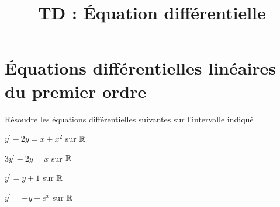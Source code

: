 \documentclass[a4paper, 11pt,reqno]{article}
\newcommand{\type}{TD }
\begin{document}
\title{\type  : Équation différentielle} 



\noindent \section{{\bf\Large{\'Equations diff\'erentielles lin\'eaires du premier ordre}}}
\vspace{0.2cm}

\begin{exercice}  \;
R\'esoudre les \'equations diff\'erentielles suivantes sur l'intervalle indiqu\'e
\begin{enumerate}
\begin{minipage}[c]{0.45\linewidth}
\item $y^{\prime}-2y=x+x^2$ sur $\mathbb{R}$
\item$3y^{\prime}-2y=x$ sur $\mathbb{R}$

\end{minipage}
\begin{minipage}[c]{0.45\linewidth}
\item $y^{\prime}=y +1$ sur $\mathbb{R}$
\item $y^{\prime}=-y+e^x$ sur $\mathbb{R}$
\end{minipage}
\end{enumerate}
\end{exercice}
\end{document}
